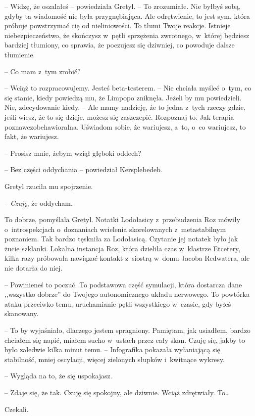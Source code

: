 \documentclass[oneside,polish,11pt,sfheadings]{mwbk}
\begin{document}
-- Widzę, że oszalałeś -- powiedziała Gretyl. -- To zrozumiałe. Nie byłbyś
sobą, gdyby ta wiadomość nie była przygnębiająca. Ale odrętwienie, to
jest sym, która próbuje powstrzymać cię od nieliniowości. To tłumi Twoje
reakcje. Istnieje niebezpieczeństwo, że skończysz w~pętli sprzężenia
zwrotnego, w~której będziesz bardziej tłumiony, co sprawia, że poczujesz
się dziwniej, co powoduje dalsze tłumienie.

-- Co mam z~tym zrobić?

-- Wciąż to rozpracowujemy. Jesteś beta-testerem. -- Nie chciała myśleć o~tym, co się stanie, kiedy powiedzą mu, że Limpopo zniknęła. Jeżeli by mu
powiedzieli. Nie, zdecydowanie kiedy. -- Ale mamy nadzieję, że to jedna z~tych rzeczy gdzie, jeśli wiesz, że to się dzieje, możesz się zaszczepić.
Rozpoznaj to. Jak terapia poznawczo\dywiz behawioralna. Uświadom sobie, że
wariujesz, a~to, o~co wariujesz, to fakt, że wariujesz.

-- Prosisz mnie, żebym wziął głęboki oddech?

-- Bez części oddychania -- powiedział Kersplebedeb.

Gretyl rzuciła mu spojrzenie.

-- \textit{Czuję}, że oddycham.

To dobrze, pomyślała Gretyl. Notatki Lodołasicy z~przebudzenia Roz
mówiły o~introspekcjach o~doznaniach wcielenia skorelowanych z~metastabilnym poznaniem. Tak bardzo tęskniła za Lodołasicą. Czytanie jej
notatek było jak żucie szklanki. Lokalna instancja Roz, która dzieliła
czas w~klastrze Etcetery, kilka razy próbowała nawiązać kontakt z~siostrą w~domu Jacoba Redwatera, ale nie dotarła do niej.

-- Powinieneś to poczuć. To podstawowa część symulacji, która dostarcza
dane ,,wszystko dobrze'' do Twojego autonomicznego układu nerwowego. To
powtórka ataku przeciwko temu, uruchamianie pętli wszystkiego w~czasie,
gdy byłeś skanowany.

-- To by wyjaśniało, dlaczego jestem spragniony. Pamiętam, jak usiadłem,
bardzo chciałem się napić, miałem sucho w~ustach przez cały skan. Czuję
się, jakby to było zaledwie kilka minut temu. -- Infografika pokazała
wyłaniającą się stabilność, mniej oscylacji, więcej zielonych słupków i~kwitnące wykresy.

-- Wygląda na to, że się uspokajasz.

-- Zdaje się, że tak. Czuję się spokojny, ale dziwnie. Wciąż zdrętwiały.
To\ldots 

Czekali.
\end{document}
